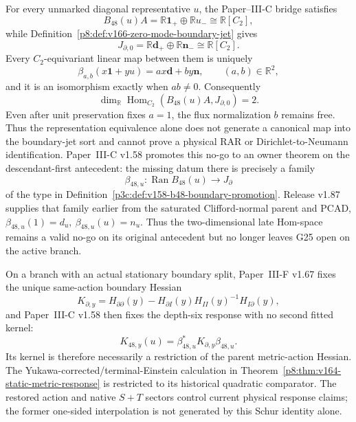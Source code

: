\documentclass[12pt,a4paper]{article}
\begin{document}
\begin{theorem}
\label{p8:thm:v166-boundary-module-owner-criterion}
For every unmarked diagonal representative \(u\), the Paper--III-C bridge
satisfies
\[
 B_{48}(u)A
 =\mathbb R\mathbf1_+\oplus\mathbb Ru_-
 \cong\mathbb R[C_2],
\]
while Definition~\ref{p8:def:v166-zero-mode-boundary-jet} gives
\[
 J_{\partial,0}
 =\mathbb R\mathbf d_+\oplus\mathbb R\mathbf n_-
 \cong\mathbb R[C_2].
\]
Every \(C_2\)-equivariant linear map between them is uniquely
\begin{equation}
 \label{p8:eq:v166-boundary-intertwiner-family}
 \beta_{a,b}(x\mathbf1+yu)
 =ax\mathbf d+by\mathbf n,
 \qquad (a,b)\in\mathbb R^2,
\end{equation}
and it is an isomorphism exactly when \(ab\ne0\).  Consequently
\begin{equation}
 \label{p8:eq:v166-boundary-hom-dimension}
 \boxed{
 \dim_{\mathbb R}\operatorname{Hom}_{C_2}
   (B_{48}(u)A,J_{\partial,0})=2.}
\end{equation}
Even after unit preservation fixes \(a=1\), the flux normalization \(b\)
remains free.  Thus the representation equivalence alone does not generate a
canonical map into the boundary-jet sort and cannot prove a physical RAR or
Dirichlet-to-Neumann identification.  Paper~III-C v1.58 promotes this no-go to
an owner theorem on the descendant-first antecedent: the missing datum there
is precisely a family
\[
 \beta_{48,u}:\operatorname{Ran}B_{48}(u)\longrightarrow J_\partial
\]
of the type in Definition~\ref{p3c:def:v158-b48-boundary-promotion}.
Release v1.87 supplies that family earlier from the saturated
Clifford-normal parent and PCAD,
\(
\beta_{48,u}(1)=d_u,\ \beta_{48,u}(u)=n_u
\).
Thus the two-dimensional late Hom-space remains a valid no-go on its original
antecedent but no longer leaves G25 open on the active branch.

On a branch with an actual stationary boundary split, Paper~III-F v1.67 fixes the unique same-action
boundary Hessian
\[
 K_{\partial,y}
 =H_{\partial\partial}(y)
  -H_{\partial I}(y)H_{II}(y)^{-1}H_{I\partial}(y),
\]
and Paper~III-C v1.58 then fixes the depth-six response with no second fitted
kernel:
\begin{equation}
 \label{p8:eq:v252-b48-schur-pullback}
 \boxed{K_{48,y}(u)=\beta_{48,u}^{*}K_{\partial,y}\beta_{48,u}.}
\end{equation}
Its kernel is therefore necessarily a restriction of the parent metric-action
Hessian.  The Yukawa-corrected/terminal-Einstein calculation in
Theorem~\ref{p8:thm:v164-static-metric-response} is restricted to its
historical quadratic comparator.  The restored action and native $S+T$
sectors control current physical response claims; the former one-sided
interpolation is not generated by this Schur identity alone.
\end{theorem}
\end{document}

